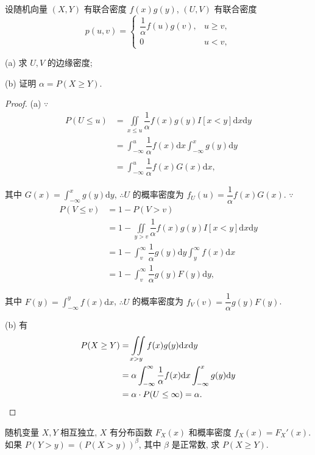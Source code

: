 \documentclass{ctexart}
\begin{document}
\begin{exercise}%
    设随机向量 $(X,Y)$ 有联合密度 $f(x)g(y)$, $(U,V)$ 有联合密度
    \[p(u,v)=\begin{cases}
        \dfrac{1}{\alpha}f(u)g(v), & u\geq v, \\[6pt]
        0 & u<v,
    \end{cases}\]

    (a) 求 $U,V$ 的边缘密度;

    (b) 证明 $\alpha=P(X\geq Y)$.
\end{exercise}
\begin{proof}
    (a) $\because$
    \begin{align*}
        P(U\leq u) & =\iint\limits_{x\leq u}\dfrac{1}{\alpha}f(x)g(y)I[x<y]\mathrm{d}x\mathrm{d}y \\
        & =\int_{-\infty}^u\dfrac{1}{\alpha}f(x)\mathrm{d}x\int_{-\infty}^xg(y)\mathrm{d}y \\
        & =\int_{-\infty}^u\dfrac{1}{\alpha}f(x)G(x)\mathrm{d}x,
    \end{align*}

    其中 $G(x)=\int_{-\infty}^xg(y)\mathrm{d}y$, $\therefore U$ 的概率密度为 $f_U(u)=\dfrac{1}{\alpha}f(x)G(x)$. $\because$
    \begin{align*}
        P(V\leq v) & =1-P(V>v) \\
        & =1-\iint\limits_{y>v}\dfrac{1}{\alpha}f(x)g(y)I[x<y]\mathrm{d}x\mathrm{d}y \\
        & =1-\int_v^\infty\dfrac{1}{\alpha}g(y)\mathrm{d}y\int_y^\infty f(x)\mathrm{d}x \\
        & =1-\int_v^\infty\dfrac{1}{\alpha}g(y)F(y)\mathrm{d}y,
    \end{align*}

    其中 $F(y)=\int_{-\infty}^yf(x)\mathrm{d}x$, $\therefore U$ 的概率密度为 $f_V(v)=\dfrac{1}{\alpha}g(y)F(y)$.

    (b) 有
    \begin{align*}
        P(X\geq Y) & =\iint\limits_{x>y}f(x)g(y)\mathrm{d}x\mathrm{d}y \\
        & =\alpha\int_{-\infty}^\infty\dfrac{1}{\alpha}f(x)\mathrm{d}x\int_{-\infty}^xg(y)\mathrm{d}y \\
        & =\alpha\cdot P(U\leq\infty)=\alpha.\qedhere
    \end{align*}
\end{proof}
\begin{exercise}%
    随机变量 $X,Y$ 相互独立, $X$ 有分布函数 $F_X(x)$ 和概率密度 $f_X(x)=F_X'(x)$. 如果 $P(Y>y)=(P(X>y))^\beta$, 其中 $\beta$ 是正常数, 求 $P(X\geq Y)$.
\end{exercise}
\end{document}
